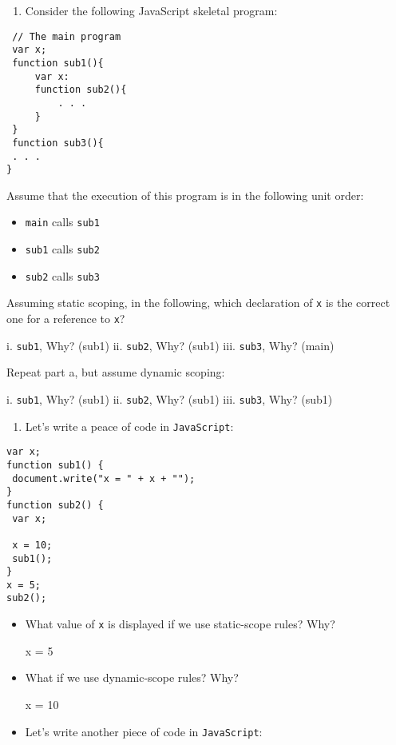 \documentclass[11pt]{article}
\begin{document}
\begin{enumerate}
\item Consider the following JavaScript skeletal program:
\end{enumerate}

\begin{verbatim}
 // The main program
 var x;
 function sub1(){
     var x:
     function sub2(){
         . . .
     }
 } 
 function sub3(){
 . . .
}
\end{verbatim}

Assume that the execution of this program is in the following unit order:

\begin{itemize}
\item \texttt{main} calls \texttt{sub1}
\item \texttt{sub1} calls \texttt{sub2}
\item \texttt{sub2} calls \texttt{sub3}
\end{itemize}

Assuming static scoping, in the following, which declaration of \texttt{x} is the
correct one for a reference to \texttt{x}?

i. \texttt{sub1}, Why? (sub1)
ii. \texttt{sub2}, Why? (sub1)
iii. \texttt{sub3}, Why? (main)

Repeat part a, but assume dynamic scoping:


i. \texttt{sub1}, Why? (sub1)
ii. \texttt{sub2}, Why? (sub1) 
iii. \texttt{sub3}, Why? (sub1)

\begin{enumerate}
\item Let's write a peace of code in \texttt{JavaScript}:
\end{enumerate}

\begin{verbatim}
var x;
function sub1() {
 document.write("x = " + x + "");
}
function sub2() {
 var x;

 x = 10;
 sub1();
}
x = 5;
sub2();
\end{verbatim}

\begin{itemize}
\item What value of \texttt{x} is displayed if we use static-scope rules? Why?

x = 5

\item What if we use dynamic-scope rules? Why?

x = 10

\item Let's write another piece of code in \texttt{JavaScript}:
\end{itemize}
\end{document}
